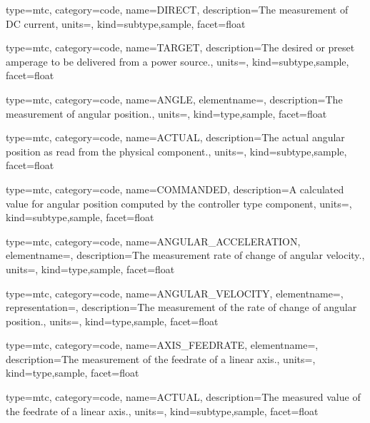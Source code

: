 {
  type=mtc,
  category=code,
  name={DIRECT},
  description={The measurement of DC current},
  units=,
  kind={subtype,sample},
  facet={\gls{float}}
}


{
  type=mtc,
  category=code,
  name={TARGET},
  description={The desired or preset amperage to be delivered from a power source.},
  units=,
  kind={subtype,sample},
  facet={\gls{float}}
}


{
  type=mtc,
  category=code,
  name={ANGLE},
  elementname=,
  description={The measurement of angular position.},
  units=,
  kind={type,sample},
  facet={\gls{float}}
}


{
  type=mtc,
  category=code,
  name={ACTUAL},
  description={The actual angular position as read from the physical component.},
  units=,
  kind={subtype,sample},
  facet={\gls{float}}
}


{
  type=mtc,
  category=code,
  name={COMMANDED},
  description={A calculated value for angular position computed by the \gls{controller} type component},
  units=,
  kind={subtype,sample},
  facet={\gls{float}}
}


{
  type=mtc,
  category=code,
  name={ANGULAR\_ACCELERATION},
  elementname=,
  description={The measurement rate of change of angular velocity.},
  units=,
  kind={type,sample},
  facet={\gls{float}}
}


{
  type=mtc,
  category=code,
  name={ANGULAR\_VELOCITY},
  elementname=,
  representation=,
  description={The measurement of the rate of change of angular position.},
  units=,
  kind={type,sample},
  facet={\gls{float}}
}


{
  type=mtc,
  category=code,
  name={AXIS\_FEEDRATE},
  elementname=,
  description={The measurement of the feedrate of a linear axis.},
  units=,
  kind={type,sample},
  facet={\gls{float}}
}


{
  type=mtc,
  category=code,
  name={ACTUAL},
  description={The measured value of the feedrate of a linear axis.},
  units=,
  kind={subtype,sample},
  facet={\gls{float}}
}


